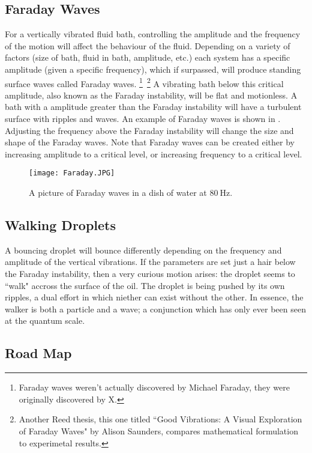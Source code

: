 \subsection{Faraday Waves}
	    For a vertically vibrated fluid bath, controlling the amplitude and the frequency of the motion will affect the behaviour of the fluid. Depending on a variety of factors (size of bath, fluid in bath, amplitude, etc.) each system has a specific amplitude (given a specific frequency), which if surpassed, will produce standing surface waves called Faraday waves. \footnote{Faraday waves weren't actually discovered by Michael Faraday, they were originally discovered by X.}~\footnote{Another Reed thesis, this one titled ``Good Vibrations: A Visual Exploration of Faraday Waves" by Alison Saunders, compares mathematical formulation to experimetal results.} A vibrating bath below this critical amplitude, also known as the Faraday instability, will be flat and motionless. A bath with a amplitude greater than the Faraday instability will have a turbulent surface with ripples and waves. An example of Faraday waves is shown in . Adjusting the frequency above the Faraday instability will change the size and shape of the Faraday waves. Note that Faraday waves can be created either by increasing amplitude to a critical level, or increasing frequency to a critical level.
	    
	    \begin{figure}[h!]
	\centering
	\texttt{[image: Faraday.JPG]}
	\caption{A picture of Faraday waves in a dish of water at $80~\mathrm{Hz}$.}
	\label{faraday waves}
\end{figure}

\subsection{Walking Droplets}
	    
	A bouncing droplet will bounce differently depending on the frequency and amplitude of the vertical vibrations. If the parameters are set just a hair below the Faraday instability, then a very curious motion arises: the droplet seems to ``walk" accross the surface of the oil. The droplet is being pushed by its own ripples, a dual effort in which niether can exist without the other. In essence, the walker is both a particle and a wave; a conjunction which has only ever been seen at the quantum scale. 
	  
\subsection{Road Map}	  
	  
